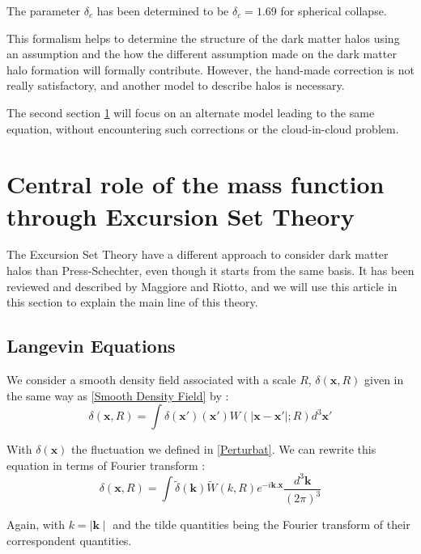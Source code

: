 The parameter $\delta_c$ has been determined to be $\delta_c = 1.69$ for spherical collapse.

This formalism helps to determine the structure of the dark matter halos using an assumption and the how the different assumption made on the dark matter halo formation will formally contribute. However, the hand-made correction is not really satisfactory, and another model to describe halos is necessary.

The second section \ref{Section II} will focus on an alternate model leading to the same equation, without encountering such corrections or the cloud-in-cloud problem.





\section{Central role of the mass function through Excursion Set Theory}
\label{Section II}

The Excursion Set Theory\cite{Bond} have a different approach to consider dark matter halos than Press-Schechter, even though it starts from the same basis. It has been reviewed and described by Maggiore and Riotto\cite{Maggiore}, and we will use this article in this section to explain the main line of this theory.

\subsection{Langevin Equations}

We consider a smooth density field associated with a scale $R$, $\delta(\textbf{x},R)$ given in the same way as \ref{Smooth Density Field} by :
\begin{equation}
\label{Smooth Density Field Magg}
\delta (\textbf{x}, R) =  \int \delta (\textbf{x}') (\textbf{x}') W(\mid \textbf{x} - \textbf{x}'\mid ; R) d^3 \textbf{x}'
\end{equation}

With $\delta(\textbf{x})$ the fluctuation we defined in \ref{Perturbat}. We can rewrite this equation in terms of Fourier transform :
\begin{equation}
\label{Fourier Smooth Density}
\delta (\textbf{x}, R) =  \int \widetilde{\delta} (\textbf{k}) \widetilde{W}(k, R) e^{-i\textbf{k}.\textbf{x}} \frac{d^3 \textbf{k}}{(2\pi)^3}
\end{equation}

Again, with $k = \mid \textbf{k} \mid$ and the tilde quantities being the Fourier transform of their correspondent quantities.

